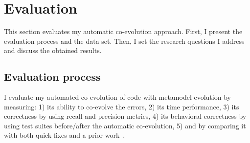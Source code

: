 




\section{Evaluation}\label{eval}

This section evaluates my automatic co-evolution approach. 
First, I present the evaluation process and the data set. Then, I set the research questions I address and discuss the obtained results.


\subsection{Evaluation process}

I evaluate my automated co-evolution of code with metamodel evolution by measuring: 1) its ability to co-evolve the errors, 2) its time performance, 3) its correctness by using recall and precision metrics, 4) its behavioral correctness by using test suites before/after the automatic co-evolution, 5) and by comparing it with both quick fixes and a prior work~\cite{Khelladi2020}. %

